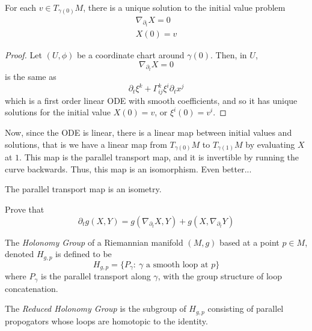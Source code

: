 \documentclass[../main.tex]{subfiles}
\begin{document}
\begin{theorem}
    For each $v\in T_{\gamma(0)}M$, there is a unique solution to the initial
    value problem
    \[
        \begin{aligned}
            \nabla_{\partial_t}X = 0\\
            X(0)=v
        \end{aligned}
    \]
\end{theorem}
\begin{proof}
    Let $(U,\phi)$ be a coordinate chart around $\gamma(0)$. Then, in $U$,
    \[
        \nabla_{\partial_t}X = 0
    \]
    is the same as
    \[
        \partial_t\xi^k + \Gamma^k_{ij}\xi^i\partial_tx^j
    \]
    which is a first order linear ODE with smooth coefficients, and so it has
    unique solutions for the initial value $X(0)=v$, or $\xi^i(0) = v^i$.
\end{proof}
Now, since the ODE is linear, there is a linear map between initial values and
solutions, that is we have a linear map from $T_{\gamma(0)}M$ to
$T_{\gamma(1)}M$ by evaluating $X$ at $1$. This map is the parallel transport
map, and it is invertible by running the curve backwards. Thus, this map is an
isomorphism. Even better...
\begin{prop}
    The parallel transport map is an isometry.
\end{prop}

\begin{hw}
Prove that
    \[
        \partial_t g(X,Y) = g(\nabla_{\partial_t}X,Y) +
        g(X,\nabla_{\partial_t}Y)
    \]
\end{hw}

\begin{defn}
    The {\em Holonomy Group} of a Riemannian manifold $(M,g)$ based at a point
    $p\in M$, denoted $H_{g,p}$ is defined to be
    \[
        H_{g,p} = \{P_{\gamma}:\ \gamma\text{ a smooth loop at $p$}\}
    \]
    where $P_{\gamma}$ is the parallel transport along $\gamma$, with the group
    structure of loop concatenation.
\end{defn}

\begin{defn}
    The {\em Reduced Holonomy Group} is the subgroup of $H_{g,p}$ consisting of
    parallel propogators whose loops are homotopic to the identity.
\end{defn}
\end{document}
